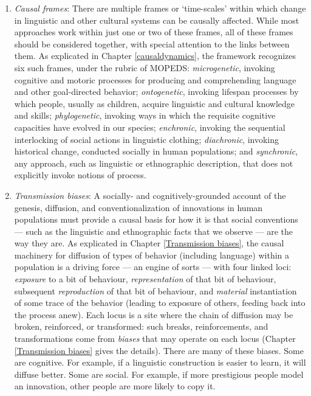 \begin{enumerate}
\item[] {\textit{Causal frames}: There are multiple frames or \textquoteleft time-scales' within which change in linguistic and other cultural systems can be causally affected. While most approaches work within just one or two of these frames, all of these frames should be considered together, with special attention to the links between them. As explicated in Chapter \ref{causaldynamics}, the framework recognizes six such frames, under the rubric of MOPEDS: \textit{microgenetic}, invoking cognitive and motoric processes for producing and comprehending language and other goal-directed behavior; \textit{ontogenetic}, invoking lifespan processes by which people, usually as children, acquire linguistic and cultural knowledge and skills; \textit{phylogenetic}, invoking ways in which the requisite cognitive capacities have evolved in our species; \textit{enchronic}, invoking the sequential interlocking of social actions in linguistic clothing; \textit{diachronic}, invoking historical change, conducted socially in human populations; and \textit{synchronic}, any approach, such as linguistic or ethnographic description, that does not explicitly invoke notions of process.}

\item[] {\textit{Transmission biases}: A socially- and cognitively-grounded account of the genesis, diffusion, and conventionalization of innovations in human populations must provide a causal basis for how it is that social conventions --- such as the linguistic and ethnographic facts that we observe --- are the way they are. As explicated in Chapter \ref{Transmission biases}, the causal machinery for diffusion of types of behavior (including language) within a population is a driving force --- an engine of sorts --- with four linked loci: \textit{exposure} to a bit of behaviour, \textit{representation} of that bit of behaviour, subsequent \textit{reproduction} of that bit of behaviour, and \textit{material} instantiation of some trace of the behavior (leading to exposure of others, feeding back into the process anew). Each locus is a site where the chain of diffusion may be broken, reinforced, or transformed: such breaks, reinforcements, and transformations come from \textit{biases} that may operate on each locus (Chapter \ref{Transmission biases} gives the details). There are many of these biases. Some are cognitive. For example, if a linguistic construction is easier to learn, it will diffuse better. Some are social. For example, if more prestigious people model an innovation, other people are more likely to copy it. }
\end{enumerate}

